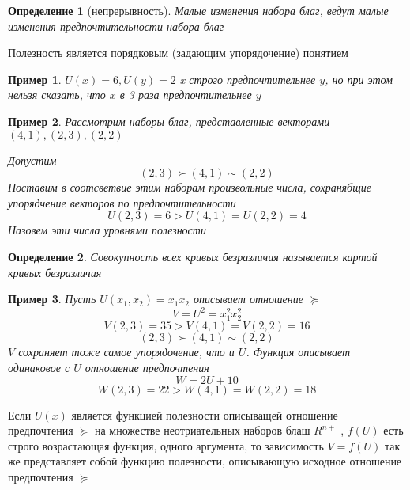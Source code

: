 \documentclass[14pt]{extarticle}
\newtheorem{definition}{Определение}
\newtheorem{example}{Пример}
\begin{document}
	\begin{definition}[непрерывность]
		Малые изменения набора благ, ведут малые изменения
		предпочтительности набора благ
	\end{definition}
	Полезность является порядковым (задающим упорядочение) 
	понятием
	\begin{example}
		$U(x) = 6,U(y)=2$ x строго предпочтительнее $y$,
		но при этом нельзя сказать, что $x$ в 3 раза
		предпочтительнее  $y$
	\end{example}
	\begin{example}
		Рассмотрим наборы благ, представленные векторами
		$(4,1),(2,3),(2,2)$
		
		Допустим 
		 \begin{equation}
			 (2,3) \succ (4,1) \sim (2,2)
		\end{equation} 
		Поставим в
		соотсветвие этим  наборам произвольные числа,
		сохранябщие упорядчение векторов по предпочтительности
		\begin{equation}
		U(2,3) = 6 > U(4,1) = U(2,2) = 4
		\end{equation} 
		Назовем эти числа уровнями полезности
	\end{example}
	\begin{definition}
		Совокупность всех кривых безразличия
		называется картой кривых безразличия
	\end{definition}
	\begin{example}
		Пусть $U(x_1,x_2) = x_1 x_2$ описывает
		отношение $\succeq$
		\begin{equation}
		V = U^2 = x_1^2 x_2 ^2
		\end{equation} 
		\begin{equation}
			V(2,3) = 35 > V(4,1) = V(2,2) = 16
		\end{equation}
		\begin{equation}
			(2,3) \succ (4,1) \sim (2,2)
		\end{equation} 
		$V$ сохраняет тоже самое упорядочение, что и
		 $U$. Функция описывает одинаковое с  $U$ отношение предпочтения
		  \begin{equation}
		 W = 2 U +10
		 \end{equation} 
		 \begin{equation}
			 W(2,3) = 22 > W(4,1) = W(2,2) = 18
		 \end{equation} 
	\end{example}
	Если $U(x)$ является функцией полезности
	описыващей отношение предпочтения  $\succeq$
	на множестве неотриательных наборов блаш  $R^{n+}$ ,
	$f(U)$ есть строго возрастающая функция, одного
	аргумента, то зависимость  $V = f(U)$ так же
	представляет собой функцию полезности,
	описывающую исходное отношение предпочтения  $\succeq$
\end{document}
